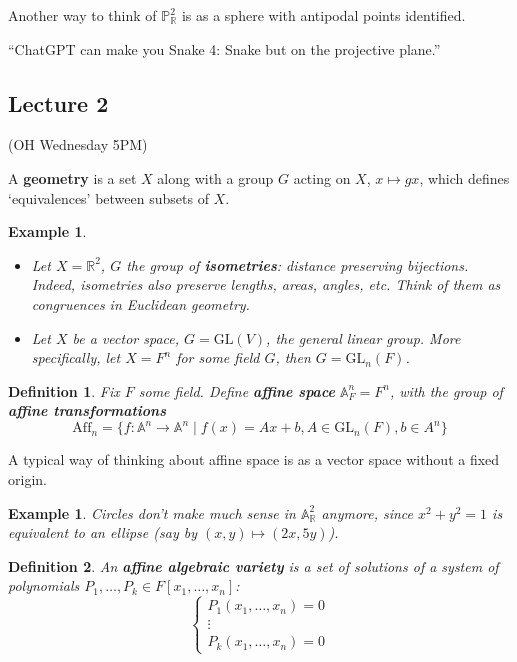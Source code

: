 \documentclass[12pt]{article}
\newcommand{\R}{\mathbb{R}}
\renewcommand{\P}{\mathbb{P}}
\newcommand{\GL}{\mathrm{GL}}
\newcommand{\A}{\mathbb{A}}
\newtheorem{definition}{Definition}
\newtheorem{example}[]{Example}
\begin{document}
        Another way to think of $\P_\R^2$ is as a sphere with antipodal points identified. \par
        ``ChatGPT can make you Snake 4: Snake but on the projective plane.''
        
    \subsection{Lecture 2}
    (OH Wednesday 5PM)\par 
    A \textbf{geometry} is a set $X$ along with a group $G$ acting on $X$, $x \mapsto gx$, which defines `equivalences' between subsets of $X$. 
    \begin{example}
        \begin{itemize}
            \item Let $X = \R^2$, $G$ the group of \textbf{isometries}: distance preserving bijections. Indeed, isometries also preserve lengths, areas, angles, etc. Think of them as congruences in Euclidean geometry. 
            \item Let $X$ be a vector space, $G = \text{GL}(V)$, the general linear group. More specifically, let $X = F^n$ for some field $G$, then $G = \GL_n(F)$.  
        \end{itemize}
    \end{example}
    \begin{definition}
        Fix $F$ some field. Define \textbf{affine space} $\A_F^n = F^n$, with the group of \textbf{affine transformations} $$\mathrm{Aff}_n = \{f: \A^n \to \A^n \mid f(x) = Ax + b, A \in \GL_n(F), b \in A^n\}$$
    \end{definition}
    A typical way of thinking about affine space is as a vector space without a fixed origin. 
    \begin{example}
        Circles don't make much sense in $\A_\R^2$ anymore, since $x^2 + y^2 = 1$ is equivalent to an ellipse (say by $(x, y) \mapsto (2x, 5y)$). 
    \end{example}
    \begin{definition}
        An \textbf{affine algebraic variety} is a set of solutions of a system of polynomials $P_1, \dots, P_k \in F[x_1, \dots, x_n]$:
        $$\begin{cases}
            P_1(x_1, \dots, x_n) = 0 \\
            \vdots \\
            P_k(x_1, \dots, x_n) = 0
        \end{cases}$$
    \end{definition}
\end{document}
